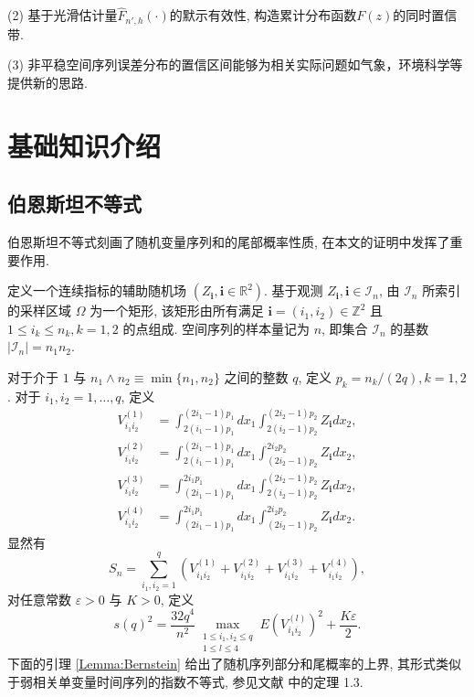 \documentclass[a4paper,openay,14pt]{ctexbook}
\numberwithin{equation}{section}
\numberwithin{lem}{section}
\newcommand{\chapterwithfancyheader}[1]{  
    \chapter{#1} %
    \thispagestyle{fancy} %
}
\begin{document}
(2) 基于光滑估计量$\hat{F}_{n',h}(\cdot)$的默示有效性, 构造累计分布函数$F(z)$的同时置信带.

(3) 非平稳空间序列误差分布的置信区间能够为相关实际问题如气象，环境科学等提供新的思路.

\chapterwithfancyheader{基础知识介绍}\label{SEC: Preliminary}


\section{伯恩斯坦不等式\label{Bernstein}}

伯恩斯坦不等式刻画了随机变量序列和的尾部概率性质, 在本文的证明中发挥了重要作用.

定义一个连续指标的辅助随机场 $(Z_{\mathbf{i}}, \mathbf{i}\in\mathbb{R}^2)$. 基于观测 ${Z_{\mathbf{i}}, \mathbf{i}\in\mathcal{I}_n}$, 由 $\mathcal{I}_n$ 所索引的采样区域 $\Omega$ 为一个矩形, 该矩形由所有满足 $\mathbf{i}=(i_1,i_2)\in\mathbb{Z}^2$ 且 $1\le i_k\le n_k, k=1,2$ 的点组成. 空间序列的样本量记为 $n$, 即集合 $\mathcal{I}_n$ 的基数 $|\mathcal{I}_n|=n_1 n_2$.

对于介于 $1$ 与 $n_1\wedge n_2\equiv \min\{n_1,n_2\}$ 之间的整数 $q$, 定义 $p_k=n_k/(2q), k=1,2$. 对于 $i_1,i_2=1,\ldots,q$, 定义
$$
\begin{aligned}
V_{i_1 i_2}^{(1)} & =\int_{2(i_1-1) p_1}^{(2 i_1-1) p_1} d x_1 \int_{2(i_2-1) p_2}^{(2 i_2-1) p_2} Z_\mathbf{i} d x_2, \\
V_{i_1 i_2}^{(2)} & =\int_{2(i_1-1) p_1}^{(2 i_1-1) p_1} d x_1 \int_{(2 i_2-1) p_2}^{2 i_2 p_2} Z_\mathbf{i} d x_2, \\
V_{i_1 i_2}^{(3)} & =\int_{(2 i_1-1) p_1}^{2 i_1 p_1} d x_1 \int_{2(i_2-1) p_2}^{(2 i_2-1) p_2} Z_\mathbf{i} d x_2, \\
V_{i_1 i_2}^{(4)} & =\int_{(2 i_1-1) p_1}^{2 i_1 p_1} d x_1 \int_{(2 i_2-1) p_2}^{2 i_2 p_2} Z_\mathbf{i} d x_2 .
\end{aligned}
$$
显然有
$$
S_n=\sum_{i_1, i_2=1}^q\left(V_{i_1 i_2}^{(1)}+V_{i_1 i_2}^{(2)}+V_{i_1 i_2}^{(3)}+V_{i_1 i_2}^{(4)}\right),
$$
对任意常数 $\varepsilon>0$ 与 $K>0$, 定义
$$
s(q)^2=\frac{32 q^4}{n^2} \max _{\substack{1 \leq i_1, i_2 \leq q \\ 1 \leq l \leq 4}} E\left(V_{i_1 i_2}^{(l)}\right)^2+\frac{K \varepsilon}{2}.
$$
下面的引理 \ref{Lemma:Bernstein} 给出了随机序列部分和尾概率的上界, 其形式类似于弱相关单变量时间序列的指数不等式, 参见文献\cite{bosq2012nonparametric} 中的定理 1.3.
\end{document}
